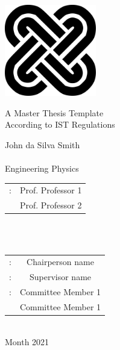 \begin{center}

\vspace{2.0cm}
\begin{center}
\includegraphics[height=40mm]{./inputs/01_Cover_Page/solomon}
\end{center}

\vspace{1.0cm}
{\FontLb A Master Thesis Template} \\ 
\vspace{0.2cm}
{\FontMn According to IST Regulations} \\
\vspace{0.9cm}

\vspace{0.6cm}
{\FontMb John da Silva Smith} \\ 

\vspace{2.0cm}
{\FontSn \coverThesis} \\
\vspace{0.3cm}
{\FontLb Engineering Physics}  \\

\vspace{1.0cm}
{\FontSn %
\begin{tabular}{ll}
	\coverSupervisors: & Prof. Professor 1 \\
	                   & Prof. Professor 2
\end{tabular} } \\

\vspace{1.0cm}
{\FontMb \coverExaminationCommittee} \\
\vspace{0.3cm}
{\FontSn %
\begin{tabular}{cc}
	  \coverChairperson:   &  Chairperson name  \\
	  \coverSupervisor:    &  Supervisor name   \\
	\coverMemberCommittee: & Committee Member 1 \\
	                       & Committee Member 1
\end{tabular} } \\

\vspace{1.5cm}
{\FontMb Month 2021} \\ 


\end{center}
